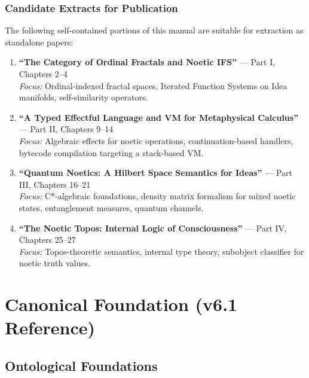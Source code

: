 \documentclass[11pt,twoside,openright]{book}
\theoremstyle{definition}
\theoremstyle{plain}
\theoremstyle{remark}
\begin{document}
\section*{Candidate Extracts for Publication}

The following self-contained portions of this manual are suitable for extraction as standalone papers:

\begin{enumerate}
  \item \textbf{``The Category of Ordinal Fractals and Noetic IFS''} --- Part I, Chapters 2--4\\
  \textit{Focus:} Ordinal-indexed fractal spaces, Iterated Function Systems on Idea manifolds, self-similarity operators.

  \item \textbf{``A Typed Effectful Language and VM for Metaphysical Calculus''} --- Part II, Chapters 9--14\\
  \textit{Focus:} Algebraic effects for noetic operations, continuation-based handlers, bytecode compilation targeting a stack-based VM.

  \item \textbf{``Quantum Noetics: A Hilbert Space Semantics for Ideas''} --- Part III, Chapters 16--21\\
  \textit{Focus:} C*-algebraic foundations, density matrix formalism for mixed noetic states, entanglement measures, quantum channels.

  \item \textbf{``The Noetic Topos: Internal Logic of Consciousness''} --- Part IV, Chapters 25--27\\
  \textit{Focus:} Topos-theoretic semantics, internal type theory, subobject classifier for noetic truth values.
\end{enumerate}

\mainmatter

\part{Canonical Foundation (v6.1 Reference)}

\chapter{Ontological Foundations}
\label{ch:foundations-reference}
\end{document}

